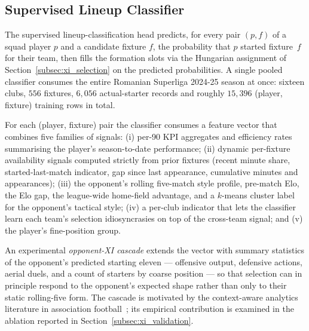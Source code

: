 \subsection{Supervised Lineup Classifier}
\label{subsec:xi_supervised}

The supervised lineup-classification head predicts, for every pair $(p, f)$ of a squad player $p$ and a candidate fixture $f$, the probability that $p$ started fixture~$f$ for their team, then fills the formation slots via the Hungarian assignment of Section~\ref{subsec:xi_selection} on the predicted probabilities. A single pooled classifier consumes the entire Romanian Superliga 2024-25 season at once: sixteen clubs, $556$ fixtures, $6{,}056$ actual-starter records and roughly $15{,}396$ (player, fixture) training rows in total.

For each (player, fixture) pair the classifier consumes a feature vector that combines five families of signals: (i) per-90 KPI aggregates and efficiency rates summarising the player's season-to-date performance; (ii) dynamic per-fixture availability signals computed strictly from prior fixtures (recent minute share, started-last-match indicator, gap since last appearance, cumulative minutes and appearances); (iii) the opponent's rolling five-match style profile, pre-match Elo, the Elo gap, the league-wide home-field advantage, and a $k$-means cluster label for the opponent's tactical style; (iv) a per-club indicator that lets the classifier learn each team's selection idiosyncrasies on top of the cross-team signal; and (v) the player's fine-position group.

An experimental \emph{opponent-XI cascade} extends the vector with summary statistics of the opponent's predicted starting eleven --- offensive output, defensive actions, aerial duels, and a count of starters by coarse position --- so that selection can in principle respond to the opponent's expected shape rather than only to their static rolling-five form. The cascade is motivated by the context-aware analytics literature in association football~\cite{lagopenas2010possession,bornn2018soccer}; its empirical contribution is examined in the ablation reported in Section~\ref{subsec:xi_validation}.

